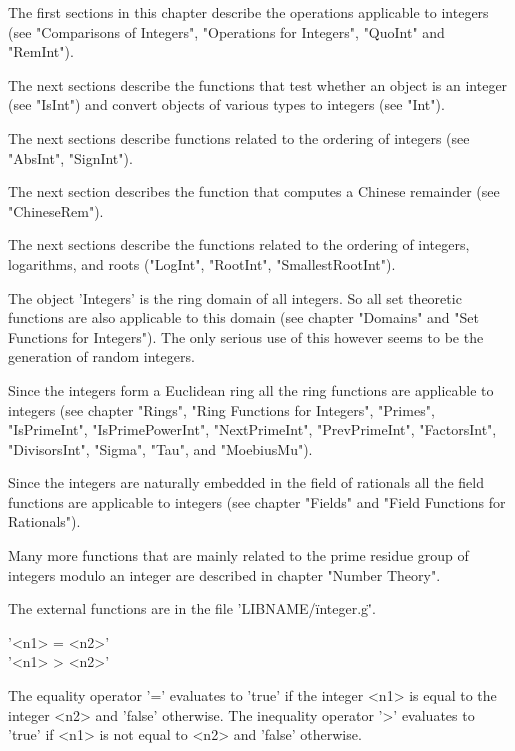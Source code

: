 The first sections in this  chapter describe the operations applicable to
integers  (see  "Comparisons of  Integers",  "Operations  for  Integers",
"QuoInt" and "RemInt").

The  next sections describe the  functions that test whether an object is
an integer (see "IsInt") and convert objects of various types to integers
(see "Int").

The next sections describe functions related to  the ordering of integers
(see "AbsInt", "SignInt").

The next section describes the function that computes a Chinese remainder
(see "ChineseRem").

The next sections  describe  the  functions related  to  the  ordering of
integers, logarithms, and roots ("LogInt", "RootInt", "SmallestRootInt").

The {\GAP} object 'Integers'  is the ring domain of all integers.  So all
set theoretic functions  are also  applicable to this domain (see chapter
"Domains"  and "Set  Functions for  Integers").  The  only serious use of
this however seems to be the generation of random integers.

Since the  integers  form a  Euclidean ring  all  the ring  functions are
applicable  to   integers  (see   chapter "Rings", "Ring   Functions  for
Integers",  "Primes", "IsPrimeInt",  "IsPrimePowerInt",   "NextPrimeInt",
"PrevPrimeInt",  "FactorsInt",  "DivisorsInt",  "Sigma",     "Tau",   and
"MoebiusMu").

Since the integers are naturally embedded in  the field of  rationals all
the field functions are applicable to  integers (see chapter "Fields" and
"Field Functions for Rationals").

Many more functions that are mainly related to the prime residue group of
integers modulo an integer are described in chapter "Number Theory".

The external functions are in the file 'LIBNAME/\"integer.g\"'.

%

'<n1> = <n2>' \\
'<n1> \<> <n2>'

The  equality operator '='  evaluates to 'true'  if the integer   <n1> is
equal to the integer <n2> and 'false' otherwise.  The inequality operator
'\<>'  evaluates  to 'true'   if <n1>  is  not equal  to <n2> and 'false'
otherwise.

